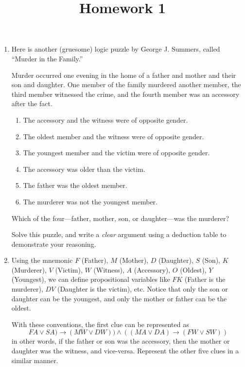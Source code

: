 \documentclass[12pt]{amsart}
\theoremstyle{definition}
\begin{document}
\title{Homework 1}

\maketitle

\begin{enumerate}

\item Here is another (gruesome) logic puzzle by George J. Summers, 
called “Murder in the Family.”

Murder occurred one evening in the home of a father and mother
and their son and daughter. One member of the family murdered
another member, the third member witnessed the crime, and the
fourth member was an accessory after the fact.

\begin{enumerate}
\item The accessory and the witness were of opposite gender.
\item The oldest member and the witness were of opposite gender.
\item The youngest member and the victim were of opposite gender.
\item The accessory was older than the victim.
\item The father was the oldest member.
\item The murderer was not the youngest member.
\end{enumerate}
Which of the four—father, mother, son, or daughter—was the murderer?

Solve this puzzle, and write a \textit{clear} argument using a 
deduction table to demonstrate your reasoning.

\item Using the mnemonic $F$ (Father), $M$ (Mother), $D$ (Daughter), 
$S$ (Son), $K$ (Murderer), $V$ (Victim), $W$ (Witness), $A$ 
(Accessory), $O$ (Oldest), $Y$ (Youngest), we can define propositional 
variables like $FK$ (Father is the murderer), $DV$ (Daughter is 
the victim), etc.
Notice that only the son or daughter can be the youngest, and only the mother
or father can be the oldest.

With these conventions, the first clue can be represented as
\begin{displaymath}
FA \lor SA) \to (MW \lor DW)) \land ((MA \lor DA) \to (FW \lor SW))
\end{displaymath}
in other words, if the father or son was the accessory, then the mother or
daughter was the witness, and vice-versa. Represent the other five clues in a
similar manner.


\end{enumerate}
\end{document}
